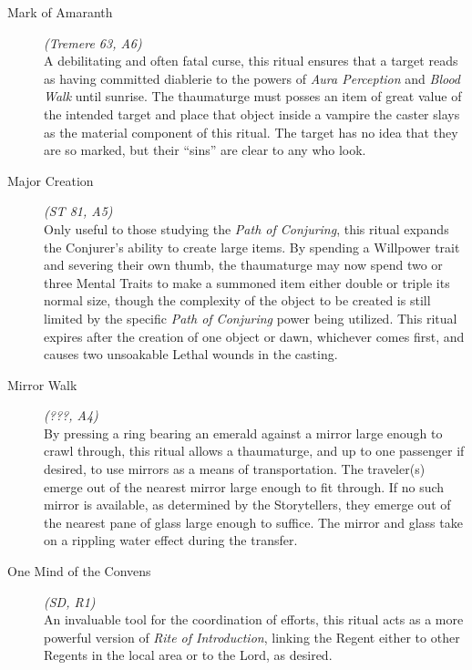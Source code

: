 \begin{description}
	\item[Mark of Amaranth] \emph{(Tremere 63, A6)} \hfill \\
	A debilitating and often fatal curse, this ritual ensures that a target reads as having committed diablerie to the powers of 
	\emph{Aura Perception} and \emph{Blood Walk} until sunrise.  The thaumaturge must posses an item of great value of the intended 
	target and place that object inside a vampire the caster slays as the material component of this ritual.  The target has no idea 
	that they are so marked, but their ``sins'' are clear to any who look. \\

	\item[Major Creation] \emph{(ST 81, A5)} \hfill \\
	Only useful to those studying the \emph{Path of Conjuring}, this ritual expands the Conjurer's ability to create large items.  
	By spending a Willpower trait and severing their own thumb, the thaumaturge may now spend two or three Mental Traits 
	to make a summoned item either double or triple its normal size, though the complexity of the object to be created is still 
	limited by the specific \emph{Path of Conjuring} power being utilized.  This ritual expires after the creation of one object 
	or dawn, whichever comes first, and causes two unsoakable Lethal wounds in the casting. \\

	\item[Mirror Walk] \emph{(???, A4)} \hfill \\
	By pressing a ring bearing an emerald against a mirror large enough to crawl through, this ritual allows a thaumaturge, and up 
	to one passenger if desired, to use mirrors as a means of transportation.  The traveler(s) emerge out of the nearest mirror 
	large enough to fit through.  If no such mirror is available, as determined by the Storytellers, they emerge out of the nearest 
	pane of glass large enough to suffice.  The mirror and glass take on a rippling water effect during the transfer. \\

	\item[One Mind of the Convens] \emph{(SD, R1)} \hfill \\
	An invaluable tool for the coordination of efforts, this ritual acts as a more powerful version of \emph{Rite of Introduction}, 
	linking the Regent either to other Regents in the local area or to the Lord, as desired. \\


\end{description}
